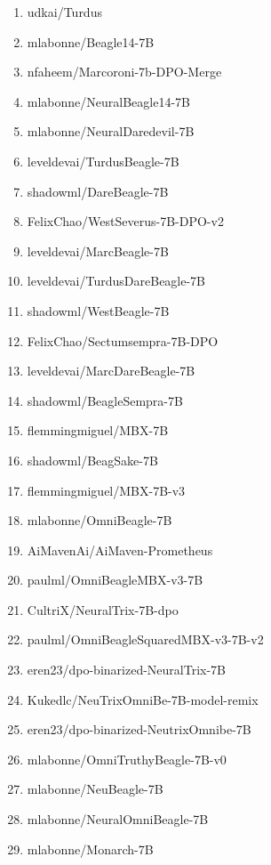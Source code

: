 \documentclass[11pt]{article}
\begin{document}
\begin{enumerate}
\item udkai/Turdus
\item mlabonne/Beagle14-7B
\item nfaheem/Marcoroni-7b-DPO-Merge
\item mlabonne/NeuralBeagle14-7B
\item mlabonne/NeuralDaredevil-7B
\item leveldevai/TurdusBeagle-7B
\item shadowml/DareBeagle-7B
\item FelixChao/WestSeverus-7B-DPO-v2
\item leveldevai/MarcBeagle-7B 
 \item leveldevai/TurdusDareBeagle-7B
\item  shadowml/WestBeagle-7B
\item  FelixChao/Sectumsempra-7B-DPO
\item  leveldevai/MarcDareBeagle-7B
\item  shadowml/BeagleSempra-7B
\item  flemmingmiguel/MBX-7B
\item  shadowml/BeagSake-7B
\item  flemmingmiguel/MBX-7B-v3
\item  mlabonne/OmniBeagle-7B
\item  AiMavenAi/AiMaven-Prometheus
\item  paulml/OmniBeagleMBX-v3-7B
\item  CultriX/NeuralTrix-7B-dpo
 \item paulml/OmniBeagleSquaredMBX-v3-7B-v2
\item  eren23/dpo-binarized-NeuralTrix-7B
\item  Kukedlc/NeuTrixOmniBe-7B-model-remix
\item  eren23/dpo-binarized-NeutrixOmnibe-7B
\item  mlabonne/OmniTruthyBeagle-7B-v0
\item  mlabonne/NeuBeagle-7B
\item  mlabonne/NeuralOmniBeagle-7B
\item mlabonne/Monarch-7B
\end{enumerate}
\end{document}

